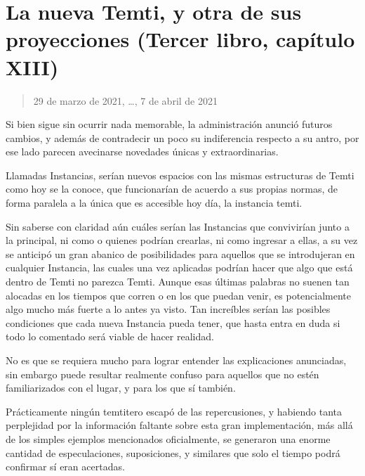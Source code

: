 \documentclass[
  spanish,
]{book}
\begin{document}
\hypertarget{la-nueva-temti-y-otra-de-sus-proyecciones-tercer-libro-capuxedtulo-xiii}{%
\section{La nueva Temti, y otra de sus proyecciones (Tercer libro, capítulo XIII)}\label{la-nueva-temti-y-otra-de-sus-proyecciones-tercer-libro-capuxedtulo-xiii}}

\begin{quote}
29 de marzo de 2021, \ldots, 7 de abril de 2021
\end{quote}

Si bien sigue sin ocurrir nada memorable, la administración anunció futuros cambios, y además de contradecir un poco su indiferencia respecto a su antro, por ese lado parecen avecinarse novedades únicas y extraordinarias.

Llamadas Instancias, serían nuevos espacios con las mismas estructuras de Temti como hoy se la conoce, que funcionarían de acuerdo a sus propias normas, de forma paralela a la única que es accesible hoy día, la instancia temti.

Sin saberse con claridad aún cuáles serían las Instancias que convivirían junto a la principal, ni como o quienes podrían crearlas, ni como ingresar a ellas, a su vez se anticipó un gran abanico de posibilidades para aquellos que se introdujeran en cualquier Instancia, las cuales una vez aplicadas podrían hacer que algo que está dentro de Temti no parezca Temti. Aunque esas últimas palabras no suenen tan alocadas en los tiempos que corren o en los que puedan venir, es potencialmente algo mucho más fuerte a lo antes ya visto. Tan increíbles serían las posibles condiciones que cada nueva Instancia pueda tener, que hasta entra en duda si todo lo comentado será viable de hacer realidad.

No es que se requiera mucho para lograr entender las explicaciones anunciadas, sin embargo puede resultar realmente confuso para aquellos que no estén familiarizados con el lugar, y para los que sí también.

Prácticamente ningún temtitero escapó de las repercusiones, y habiendo tanta perplejidad por la información faltante sobre esta gran implementación, más allá de los simples ejemplos mencionados oficialmente, se generaron una enorme cantidad de especulaciones, suposiciones, y similares que solo el tiempo podrá confirmar sí eran acertadas.
\end{document}
